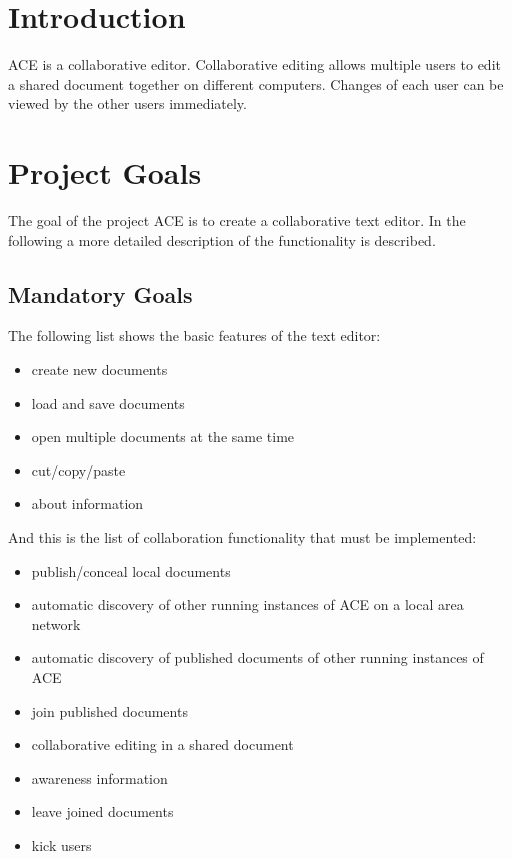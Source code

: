 \documentclass[11pt,a4paper]{article}
\begin{document}


\section{Introduction}

ACE is a collaborative editor. Collaborative editing allows multiple users
to edit a shared document together on different computers. Changes of each user can be viewed 
by the other users immediately.

\section{Project Goals}

The goal of the project ACE is to create a collaborative text editor. In the following a more detailed
description of the functionality is described.

\subsection{Mandatory Goals}

The following list shows the basic features of the text editor:

\begin{itemize}
 \item create new documents
 \item load and save documents
 \item open multiple documents at the same time
 \item cut/copy/paste
 \item about information
\end{itemize}

And this is the list of collaboration functionality that must be implemented:

\begin{itemize}
 \item publish/conceal local documents
 \item automatic discovery of other running instances of ACE on a local area network
 \item automatic discovery of published documents of other running instances of ACE
 \item join published documents
 \item collaborative editing in a shared document
 \item awareness information
 \item leave joined documents
 \item kick users
\end{itemize}
\end{document}
